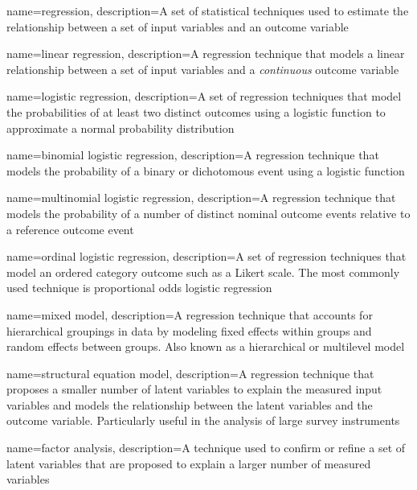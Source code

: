{
    name={regression},
    description={A set of statistical techniques used to estimate the relationship between a set of input variables and an outcome variable}
}

{
    name={linear regression},
    description={A regression technique that models a linear relationship between a set of input variables and a \textit{continuous} outcome variable}
}

{
    name={logistic regression},
    description={A set of regression techniques that model the probabilities of at least two distinct outcomes using a logistic function to approximate a normal probability distribution}
}

{
    name={binomial logistic regression},
    description={A regression technique that models the probability of a binary or dichotomous event using a logistic function}
}

{
    name={multinomial logistic regression},
    description={A regression technique that models the probability of a number of distinct nominal outcome events relative to a reference outcome event}
}

{
    name={ordinal logistic regression},
    description={A set of regression techniques that model an ordered category outcome such as a Likert scale.  The most commonly used technique is proportional odds logistic regression}
}

{
    name={mixed model},
    description={A regression technique that accounts for hierarchical groupings in data by modeling fixed effects within groups and random effects between groups.  Also known as a hierarchical or multilevel model}
}

{
    name={structural equation model},
    description={A regression technique that proposes a smaller number of latent variables to explain the measured input variables and models the relationship between the latent variables and the outcome variable.  Particularly useful in the analysis of large survey instruments}
}

{
    name={factor analysis},
    description={A technique used to confirm or refine a set of latent variables that are proposed to explain a larger number of measured variables}
}

